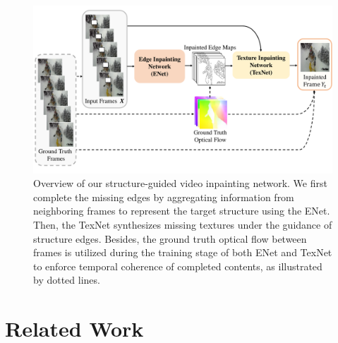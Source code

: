 \begin{figure}[t]
	\centering
	\includegraphics[width=1.01\columnwidth]{zong} %
	\caption{Overview of our structure-guided video inpainting network. We first complete the missing edges by aggregating information from neighboring frames to represent the target structure using the ENet. Then, the TexNet synthesizes missing textures under the guidance of structure edges. Besides, the ground truth optical flow between frames is utilized during the training stage of both ENet and TexNet to enforce temporal coherence of completed contents, as illustrated by dotted lines.}
	\label{fig:overview}
\end{figure}






\section{Related Work}
